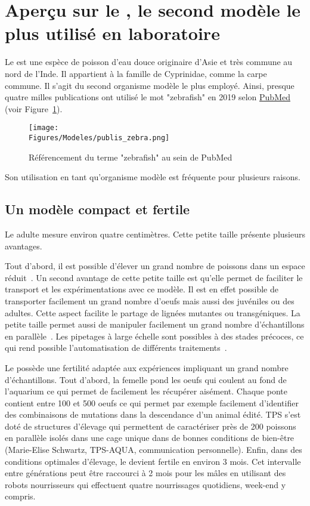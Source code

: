 \documentclass[\main/main.tex]{subfiles}
\begin{document}
\section{Aperçu sur le \pz{}, le second modèle le plus utilisé en laboratoire}

%
Le \pz{} est une espèce de poisson d'eau douce originaire d'Asie et très commune au nord de l'Inde.
%
Il appartient à la famille de Cyprinidae, comme la carpe commune.
%
Il s'agit du second organisme modèle le plus employé.
%
Ainsi, presque quatre milles publications ont utilisé le mot "zebrafish" en 2019
selon \href{https://pubmed.ncbi.nlm.nih.gov/?term=zebrafish&sort=pubdate}{PubMed}
(voir Figure~\ref{fig:model:pz:stats}).

\begin{figure}[htbp]{\textwidth} 
    \centering
       \centering \texttt{[image: \\Figures/Modeles/publis\_zebra.png]}
       \caption{
            \label{fig:model:pz:stats}Référencement du terme "zebrafish" au sein de PubMed
            }
\end{figure}
%
Son utilisation en tant qu'organisme modèle est fréquente pour plusieurs raisons.

    \subsection{Un modèle compact et fertile}
    
%
Le \pz{} adulte mesure environ quatre centimètres.
%
Cette petite taille présente plusieurs avantages.

%
Tout d'abord, il est possible d'élever un grand nombre de poissons dans un espace réduit~\cite{avdesh_2012}.
%
Un second avantage de cette petite taille est qu'elle permet de faciliter le transport et les expérimentations avec ce modèle.
%
Il est en effet possible de transporter facilement un grand nombre d'oeufs mais aussi des juvéniles ou des adultes.
%
Cette aspect facilite le partage de lignées mutantes ou transgéniques.
%
La petite taille permet aussi de manipuler facilement un grand nombre d'échantillons en parallèle~\cite{wittbrodt_2014,brion_2012}. Les pipetages à large échelle sont possibles à des stades précoces,
ce qui rend possible l'automatisation de différents traitements~\cite{mandrell_2012,teixid_2019}.

Le \pz{} possède une fertilité adaptée aux expériences impliquant un grand nombre d'échantillons.
%
Tout d'abord, la femelle pond les oeufs qui coulent au fond de l'aquarium ce  qui permet de facilement les récupérer aisément. Chaque ponte contient entre 100 et 500 oeufs ce qui permet par exemple facilement d'identifier des combinaisons de mutations dans la descendance d'un animal édité. TPS s'est doté de structures d'élevage qui permettent de caractériser près de 200 poissons en parallèle isolés dans une cage unique dans de bonnes conditions de bien-être (Marie-Elise Schwartz, TPS-AQUA, communication personnelle).  
%
Enfin, dans des conditions optimales d'élevage, le \pz{} devient fertile en environ 3 mois. Cet intervalle entre générations peut être raccourci à 2 mois pour les mâles en utilisant des robots nourrisseurs qui effectuent quatre nourrissages quotidiens, week-end y compris. 
\end{document}
